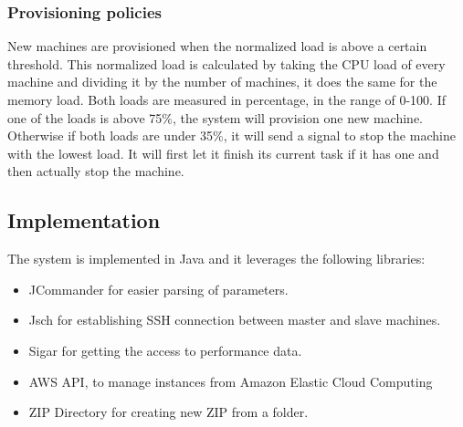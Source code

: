 \subsubsection{Provisioning policies}
New machines are provisioned when the normalized load is above a certain threshold. This normalized load is calculated by taking the CPU load of every machine and dividing it by the number of machines, it does the same for the memory load. Both loads are measured in percentage, in the range of 0-100. If one of the loads is above 75\%, the system will provision one new machine. Otherwise if both loads are under 35\%, it will send a signal to stop the machine with the lowest load. It will first let it finish its current task if it has one and then actually stop the machine.
\subsection{Implementation}
The system is implemented in Java and it leverages the following libraries:
\begin{itemize}
 \item JCommander for easier parsing of parameters.
 \item Jsch for establishing SSH connection between master and slave machines.
 \item Sigar for getting the access to performance data.
 \item AWS API, to manage instances from Amazon Elastic Cloud Computing
 \item ZIP Directory for creating new ZIP from a folder.
\end{itemize}



